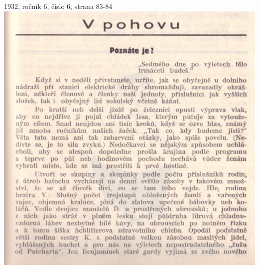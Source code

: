 \documentclass[11pt]{article}
\begin{document}
1932, ročník 6, číslo 6, strana 83-84 \\
\includegraphics[width=\imagewidth]{original/1932/Skener_20250320 (9).jpg}
\end{document}
